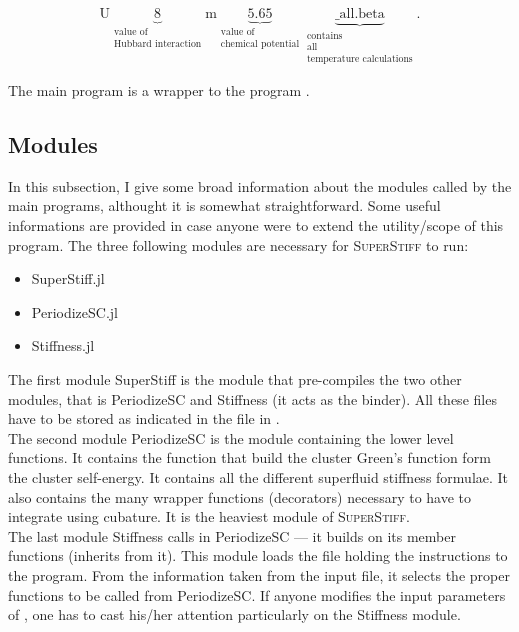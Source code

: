 \documentclass{article}
\begin{document}
\begin{equation}
\label{name_folder_inside_tp}
\text{U}\underbrace{8}_{\substack{\text{value of}\\ \text{Hubbard interaction}}}\text{m}\underbrace{5.65}_{\substack{\text{value of}\\ \text{chemical potential}}}\underbrace{\text{\_all.beta}}_{\substack{\text{contains}\\ \text{all}\\ \text{temperature calculations}}}.
\end{equation}

The main program  is a wrapper to the program .

\subsection{Modules}
\label{sec:modules}

In this subsection, I give some broad information about the modules called by the main programs, althought it is somewhat straightforward. Some useful informations are provided in case anyone were to extend the utility/scope of this program. The three following modules are necessary for \textsc{SuperStiff} to run:

\begin{itemize}
\item SuperStiff.jl
\item PeriodizeSC.jl
\item Stiffness.jl
\end{itemize}

The first module SuperStiff is the module that pre-compiles the two other modules, that is PeriodizeSC and Stiffness (it acts as the binder). All these files have to be stored as indicated in the  file in .\\

The second module PeriodizeSC is the module containing the lower level functions. It contains the function that build the cluster Green's function form the cluster self-energy. It contains all the different superfluid stiffness formulae. It also contains the many wrapper functions (decorators) necessary to have to integrate using cubature. It is the heaviest module of \textsc{SuperStiff}.\\

The last module Stiffness calls in PeriodizeSC --- it builds on its member functions (inherits from it). This module loads the  file holding the instructions to the program. From the information taken from the input file, it selects the proper functions to be called from PeriodizeSC. If anyone modifies the input parameters of , one has to cast his/her attention particularly on the Stiffness module.\\
\end{document}
